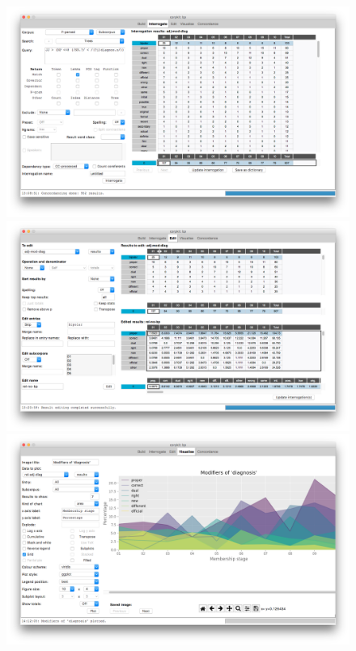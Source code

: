 \begin{figure}[htb]

  \begin{minipage}[b]{0.5\linewidth}
    \centering
    \includegraphics[width=.98\linewidth]{../images/interro} 
    \vspace{1ex}
  \end{minipage}%
  \begin{minipage}[b]{0.5\linewidth}
    \centering
    \includegraphics[width=.98\linewidth]{../images/edit} 
    \vspace{1ex}
  \end{minipage} 
  \begin{minipage}[b]{0.5\linewidth}
    \centering
    \includegraphics[width=.98\linewidth]{../images/plot} 

\end{minipage}
\end{figure}
